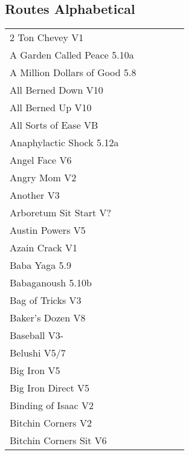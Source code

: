 \begin{flushleft}

\needspace{1.5cm}
\section{Routes Alphabetical}
\begin{center}
\begin{supertabular}{p{0.76\linewidth}p{0.08\linewidth}}
2 Ton Chevey V1 & \pageref{rt:2 Ton Chevey} \\
A Garden Called Peace 5.10a & \pageref{rt:A Garden Called Peace} \\
A Million Dollars of Good 5.8 & \pageref{rt:A Million Dollars of Good} \\
All Berned Down V10 & \pageref{rt:All Berned Down} \\
All Berned Up V10 & \pageref{rt:All Berned Up} \\
All Sorts of Ease VB & \pageref{rt:All Sorts of Ease} \\
Anaphylactic Shock 5.12a & \pageref{rt:Anaphylactic Shock} \\
Angel Face V6 & \pageref{rt:Angel Face} \\
Angry Mom V2 & \pageref{rt:Angry Mom} \\
Another V3 & \pageref{rt:Another} \\
Arboretum Sit Start V? & \pageref{vr:Arboretum Sit Start} \\
Austin Powers V5 & \pageref{rt:Austin Powers} \\
Azain Crack V1 & \pageref{vr:Azain Crack} \\
Baba Yaga 5.9 & \pageref{rt:Baba Yaga} \\
Babaganoush 5.10b & \pageref{rt:Babaganoush} \\
Bag of Tricks V3 & \pageref{vr:Bag of Tricks} \\
Baker's Dozen V8 & \pageref{vr:Baker's Dozen} \\
Baseball V3- & \pageref{rt:Baseball} \\
Belushi V5/7 & \pageref{rt:Belushi} \\
Big Iron V5 & \pageref{rt:Big Iron} \\
Big Iron Direct V5 & \pageref{vr:Big Iron Direct} \\
Binding of Isaac V2 & \pageref{rt:Binding of Isaac} \\
Bitchin Corners V2 & \pageref{rt:Bitchin Corners} \\
Bitchin Corners Sit V6 & \pageref{vr:Bitchin Corners Sit} \\

\end{supertabular}
\end{center}
\end{flushleft}
